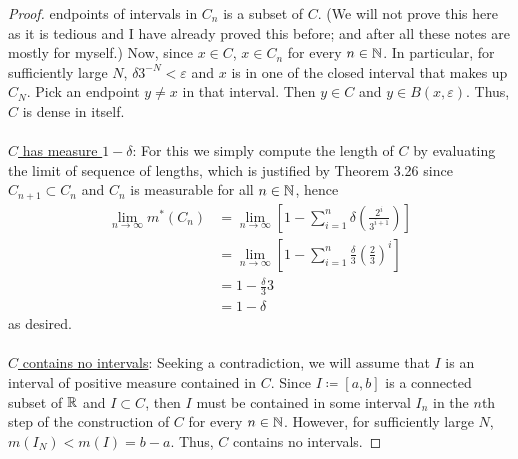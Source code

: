 \begin{proof}
{    endpoints of intervals in $C_n$ is a subset of $C$}. (We will not prove
  this here as it is tedious and I have already proved this before; and
  after all these notes are mostly for myself.) Now, since $x\in C$,
  $x\in C_n$ for every $n\in\mathbb{N}$. In particular, for sufficiently large
  $N$, $\delta 3^{-N}<\varepsilon$ and $x$ is in one of the closed interval
  that makes up $C_N$. Pick an endpoint $y\neq x$ in that interval. Then
  $y\in C$ and $y\in B(x,\varepsilon)$. Thus, $C$ is dense in itself.
  \\\\
  \underline{$C$ has measure $1-\delta$}: For this we simply compute the
  length of $C$ by evaluating the limit of sequence of lengths, which is
  justified by Theorem 3.26 since $C_{n+1}\subset C_n$ and $C_n$ is
  measurable for all $n\in\mathbb{N}$, hence
  \begin{align*}
    \lim_{n\to\infty}m^*(C_n)
    &=\lim_{n\to\infty}
      \left[1-\sum_{i=1}^n\delta\left(\frac{2^i}{3^{i+1}}\right)\right]\\
    &=\lim_{n\to\infty}
      \left[1-\sum_{i=1}^n\frac{\delta}{3}\left(\frac{2}{3}\right)^i\right]\\
    &=1-\frac{\delta}{3}3\\
    &=1-\delta
  \end{align*}
  as desired.
  \\\\
  \underline{$C$ contains no intervals}: Seeking a contradiction, we will
  assume that $I$ is an interval of positive measure contained in
  $C$. Since $I\coloneq[a,b]$ is a connected subset of $\mathbb{R}$ and
  $I\subset C$, then $I$ must be contained in some interval $I_n$ in the
  $n$th step of the construction of $C$ for every $n\in\mathbb{N}$. However, for
  sufficiently large $N$, $m(I_N)<m(I)=b-a$. Thus, $C$ contains no
  intervals.
\end{proof}

